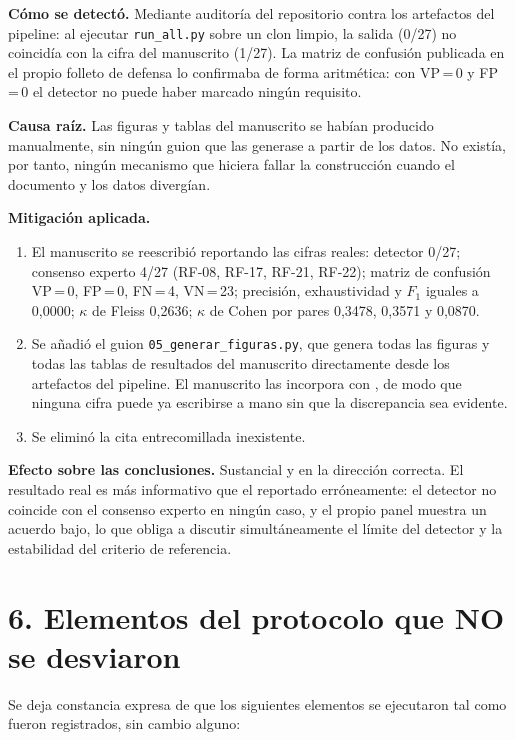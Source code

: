 \documentclass[11pt,a4paper]{article}
\begin{document}
\textbf{Cómo se detectó.} Mediante auditoría del repositorio contra los
artefactos del pipeline: al ejecutar \texttt{run\_all.py} sobre un clon limpio,
la salida (0/27) no coincidía con la cifra del manuscrito (1/27). La matriz de
confusión publicada en el propio folleto de defensa lo confirmaba de forma
aritmética: con VP\,=\,0 y FP\,=\,0 el detector no puede haber marcado ningún
requisito.

\textbf{Causa raíz.} Las figuras y tablas del manuscrito se habían producido
manualmente, sin ningún guion que las generase a partir de los datos. No
existía, por tanto, ningún mecanismo que hiciera fallar la construcción cuando
el documento y los datos divergían.

\textbf{Mitigación aplicada.}
\begin{enumerate}
\item El manuscrito se reescribió reportando las cifras reales: detector 0/27;
      consenso experto 4/27 (RF-08, RF-17, RF-21, RF-22); matriz de confusión
      VP\,=\,0, FP\,=\,0, FN\,=\,4, VN\,=\,23; precisión, exhaustividad y
      $F_1$ iguales a 0,0000; $\kappa$ de Fleiss 0,2636; $\kappa$ de Cohen por
      pares 0,3478, 0,3571 y 0,0870.
\item Se añadió el guion \texttt{05\_generar\_figuras.py}, que genera todas las
      figuras y todas las tablas de resultados del manuscrito directamente
      desde los artefactos del pipeline. El manuscrito las incorpora con
      \verb||, de modo que ninguna cifra puede ya escribirse a mano sin
      que la discrepancia sea evidente.
\item Se eliminó la cita entrecomillada inexistente.
\end{enumerate}

\textbf{Efecto sobre las conclusiones.} Sustancial y en la dirección correcta.
El resultado real es más informativo que el reportado erróneamente: el detector
no coincide con el consenso experto en ningún caso, y el propio panel muestra
un acuerdo bajo, lo que obliga a discutir simultáneamente el límite del
detector y la estabilidad del criterio de referencia.

\section*{6. Elementos del protocolo que NO se desviaron}

Se deja constancia expresa de que los siguientes elementos se ejecutaron tal
como fueron registrados, sin cambio alguno:
\end{document}
